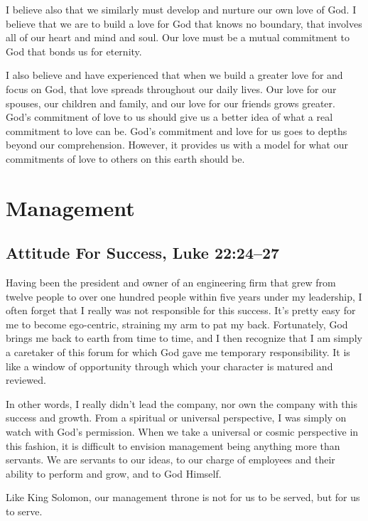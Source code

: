 \documentclass[12pt]{memoir}
\begin{document}
I believe also that we similarly must develop and nurture our own
love of God. I believe that we are to build a love for God that knows
no boundary, that involves all of our heart and mind and soul. Our
love must be a mutual commitment to God that bonds us for eternity. 

I also believe and have experienced that when we build a greater love
for and focus on God, that love spreads throughout our daily lives.
Our love for our spouses, our children and family, and our love for
our friends grows greater. God's commitment of love to us should give
us a better idea of what a real commitment to love can be. God's commitment and love for us goes to depths beyond our comprehension.
However, it provides us with a model for what our commitments of love
to others on this earth should be. 

\section{Management}

\subsection[Attitude For Success]{Attitude For Success, Luke 22:24--27}


Having been the president and owner of an engineering firm that grew
from twelve people to over one hundred people within five years under
my leadership, I often forget that I really was not responsible for
this success. It's pretty easy for me to become ego-centric, straining
my arm to pat my back. Fortunately, God brings me back to earth from
time to time, and I then recognize that I am simply a caretaker of
this forum for which God gave me temporary responsibility. It is
like a window of opportunity through which your character is matured
and reviewed. 

In other words, I really didn't lead the company, nor own the company
with this success and growth. From a spiritual or universal perspective,
I was simply on watch with God's permission. When we take a universal
or cosmic perspective in this fashion, it is difficult to envision
management being anything more than servants. We are servants to our
ideas, to our charge of employees and their ability to perform and
grow, and to God Himself.

Like King Solomon, our management throne is not for us to be served,
but for us to serve. 
\end{document}

